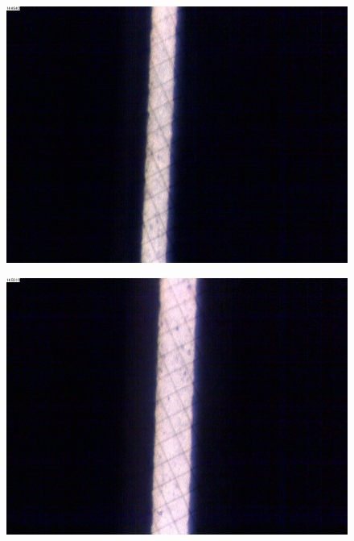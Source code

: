 \begin{figure}[htbp]
\begin{minipage}[ht]{0.48\hsize}
        \includegraphics[width=\linewidth]{src/figures/result/ss2_slit.jpg}
        \label{subfig:ss2_slit}
    \end{minipage}
    \begin{minipage}[ht]{0.48\hsize}\centering
        \includegraphics[width=\linewidth]{src/figures/result/ss3_slit.jpg}
        \label{subfig:ss3_slit}
    \end{minipage}
    \begin{minipage}[ht]{0.48\hsize}\centering

\end{minipage}
\end{figure}
